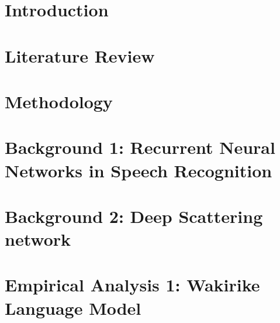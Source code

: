 \documentclass[12pt,twoside]{report}
\begin{document}
\listoffigures
 
\listoftables

\clearpage
 

\printglossaries

    
\chapter{Introduction}\label{ch1_intro}


\chapter{Literature Review}\label{c02}\label{ch2litrev}


\chapter{Methodology}\label{ch3Method}


\chapter{Background 1: Recurrent Neural Networks in Speech Recognition}\label{ch3RNN}


\chapter{Background 2: Deep Scattering network}\label{ch4DSN}


\chapter{Empirical Analysis 1: Wakirike Language Model}\label{ch6_wlm}

\end{document}
